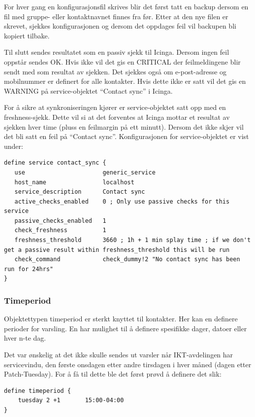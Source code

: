 For hver gang en konfigurasjonsfil skrives blir det først tatt en backup dersom en fil med gruppe- eller kontaktnavnet finnes fra før. Etter at den nye filen er skrevet, sjekkes konfigurasjonen og dersom det oppdages feil vil backupen bli kopiert tilbake. 

Til slutt sendes resultatet som en passiv sjekk til Icinga. Dersom ingen feil oppstår sendes OK. Hvis ikke vil det gis en CRITICAL der feilmeldingene blir sendt med som resultat av sjekken. Det sjekkes også om e-post-adresse og mobilnummer er definert for alle kontakter. Hvis dette ikke er satt vil det gis en WARNING på service-objektet ``Contact sync'' i Icinga.

For å sikre at synkroniseringen kjører er service-objektet satt opp med en freshness-sjekk. Dette vil si at det forventes at Icinga mottar et resultat av sjekken hver time (pluss en feilmargin på ett minutt). Dersom det ikke skjer vil det bli satt en feil på ``Contact sync''. Konfigurasjonen for service-objektet er vist under:
\begin{lstlisting}[style=example]
define service contact_sync {
   use 						generic_service
   host_name    	  		localhost
   service_description  	Contact sync
   active_checks_enabled   	0 ; Only use passive checks for this service
   passive_checks_enabled  	1
   check_freshness      	1
   freshness_threshold     	3660 ; 1h + 1 min splay time ; if we don't get a passive result within freshness_threshold this will be run
   check_command     		check_dummy!2 "No contact sync has been run for 24hrs" 
}
\end{lstlisting}

\subsubsection{Timeperiod}

Objektettypen timeperiod er sterkt knyttet til kontakter. Her kan en definere perioder for varsling. En har mulighet til å definere spesifikke dager, datoer eller hver n-te dag. 

Det var ønskelig at det ikke skulle sendes ut varsler når IKT-avdelingen har servicevindu, den første onsdagen etter andre tirsdagen i hver måned (dagen etter Patch-Tuesday\cite{wiki:patch}). For å få til dette ble det først prøvd å definere det slik:

\begin{lstlisting}[style=example]
define timeperiod {
    tuesday 2 +1       15:00-04:00
}
\end{lstlisting}

